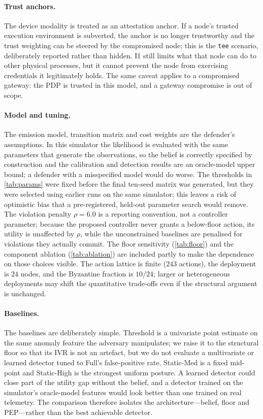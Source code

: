\paragraph{Trust anchors.} The device modality is treated as an attestation
anchor. If a node's trusted execution environment is subverted, the anchor is no
longer trustworthy and the trust weighting can be steered by the compromised node;
this is the \texttt{tee} scenario, deliberately reported rather than hidden. I1
still limits what that node can do to other physical processes, but it cannot
prevent the node from exercising credentials it legitimately holds. The same caveat
applies to a compromised gateway: the PDP is trusted in this model, and a gateway
compromise is out of scope.

\paragraph{Model and tuning.} The emission model, transition matrix and cost
weights are the defender's assumptions. In this simulator the likelihood is
evaluated with the same parameters that generate the observations, so the belief
is correctly specified by construction and the calibration and detection results
are an oracle-model upper bound; a defender with a misspecified model would do
worse. The thresholds in \cref{tab:params} were fixed before the final ten-seed
matrix was generated, but
they were selected using earlier runs on the same simulator; this leaves a risk of
optimistic bias that a pre-registered, held-out parameter search would remove. The
violation penalty $\rho=6.0$ is a reporting convention, not a controller
parameter; because the proposed controller never grants a below-floor action, its
utility is unaffected by $\rho$, while the unconstrained baselines are penalised
for violations they actually commit. The floor sensitivity (\cref{tab:floor}) and
the component ablation (\cref{tab:ablation}) are included partly to make the
dependence on those choices visible. The action lattice is finite ($243$ actions),
the deployment is $24$ nodes, and the Byzantine fraction is $10/24$; larger or
heterogeneous deployments may shift the quantitative trade-offs even if the
structural argument is unchanged.

\paragraph{Baselines.} The baselines are deliberately simple. Threshold is a
univariate point estimate on the same anomaly feature the adversary manipulates;
we raise it to the structural floor so that its IVR is not an artefact, but we do
not evaluate a multivariate or learned detector tuned to Full's false-positive
rate. Static-Med is a fixed mid-point and Static-High is the strongest uniform
posture. A learned detector could close part of the utility gap without the
belief, and a detector trained on the simulator's oracle-model features would look
better than one trained on real telemetry. The comparison therefore isolates the
architecture---belief, floor and PEP---rather than the best achievable detector.

